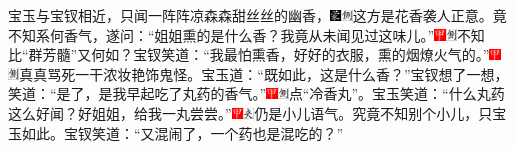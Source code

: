 宝玉与宝钗相近，只闻一阵阵凉森森甜丝丝的幽香，{\includegraphics[width=3mm]{../Images/00006}\includegraphics[width=3mm]{../Images/00011}\footnotesize \kaishu 这方是花香袭人正意。}竟不知系何香气，遂问：``姐姐熏的是什么香？我竟从未闻见过这味儿。''{\includegraphics[width=3mm]{../Images/00002}\includegraphics[width=3mm]{../Images/00011}\footnotesize \kaishu 不知比``群芳髓''又何如？}宝钗笑道：``我最怕熏香，好好的衣服，熏的烟燎火气的。''{\includegraphics[width=3mm]{../Images/00002}\includegraphics[width=3mm]{../Images/00011}\footnotesize \kaishu 真真骂死一干浓妆艳饰鬼怪。}宝玉道：``既如此，这是什么香？''宝钗想了一想，笑道：``是了，是我早起吃了丸药的香气。''{\includegraphics[width=3mm]{../Images/00002}\includegraphics[width=3mm]{../Images/00011}\footnotesize \kaishu 点``冷香丸''。}宝玉笑道：``什么丸药这么好闻？好姐姐，给我一丸尝尝。''{\includegraphics[width=3mm]{../Images/00002}\includegraphics[width=3mm]{../Images/00012}\footnotesize \kaishu 仍是小儿语气。究竟不知别个小儿，只宝玉如此。}宝钗笑道：``又混闹了，一个药也是混吃的？''

